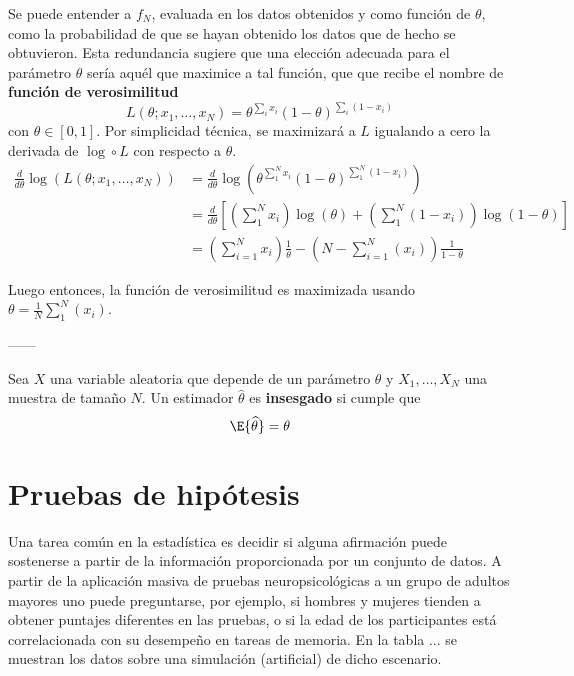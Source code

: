 Se puede entender a $f_N$, evaluada en los datos obtenidos y como función de $\theta$, como la probabilidad de que se hayan obtenido los datos que de hecho se obtuvieron.
%
Esta redundancia sugiere que una elección adecuada para el parámetro $\theta$ sería aquél que maximice a tal función, que que recibe el nombre de \textbf{función de verosimilitud}
\begin{equation}
L(\theta; x_1, \dots, x_N) = \theta^{\sum_i x_i}(1-\theta)^{\sum_i(1-x_i)}
\end{equation}
con $\theta \in [0, 1]$. Por simplicidad técnica, se maximizará a $L$ igualando a cero la derivada de $\log \circ L$ con respecto a $\theta$.
\begin{align*}
\frac{d}{d\theta} \log\left( L(\theta; x_1, \dots, x_N)\right)
&= 
\frac{d}{d\theta} \log\left(\theta^{\sum_1^{N} x_i}(1-\theta)^{\sum_1^{N}(1-x_i)}\right) \\
&=
\frac{d}{d\theta} \left[ \left( \sum_{1}^{N} x_i \right) \log(\theta) + 
\left( \sum_{1}^{N}(1-x_i) \right) \log (1-\theta)\right] \\
&= \left( \sum_{i=1}^{N} x_i \right) \frac{1}{\theta} -
\left( N - \sum_{i=1}^{N}(x_i) \right) \frac{1}{1-\theta}
\end{align*}

Luego entonces, la función de verosimilitud es maximizada usando $\theta = \frac{1}{N} \sum_{1}^{N}(x_i)$.

------

\begin{definicion}
Sea $X$ una variable aleatoria que depende de un parámetro $\theta$ y $X_1, \dots, X_N$ una muestra de tamaño $N$. Un estimador $\widehat{\theta}$ es \textbf{insesgado} si cumple que
\begin{equation}
\E{\widehat{\theta}} = \theta
\end{equation}
\end{definicion}


\section{Pruebas de hipótesis}

Una tarea común en la estadística es decidir si alguna afirmación puede sostenerse a partir de la
información proporcionada por un conjunto de datos. 
%
A partir de la aplicación masiva de pruebas neuropsicológicas a un grupo de adultos mayores uno 
puede preguntarse, por ejemplo, si hombres y mujeres tienden a obtener puntajes diferentes en las
pruebas, o si la edad de los participantes está correlacionada con su desempeño en tareas de 
memoria.
%
En la tabla ... se muestran los datos sobre una simulación (artificial) de dicho escenario.

